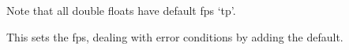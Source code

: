 %
  \begin{macro}{\@dblfloat}
%
    \begin{teX}
\def\@dblfloat{%
  \if@twocolumn\let\reserved@a\@dbflt\else\let\reserved@a\@float\fi
  \reserved@a}
    \end{teX}
  \end{macro}
%
%    
  \begin{macro}{\fps@dbl}
  Note that all double floats have default fps `tp'.
  \end{macro}
%  
  \begin{macro}{\@setfps}
    This sets the fps, dealing with error conditions by adding
    the default.
%    
  \end{macro}
%
